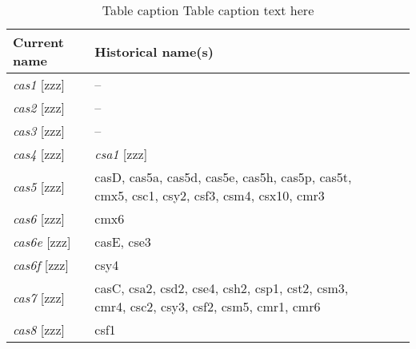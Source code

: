 \begin{table}
\caption{{Table caption} Table caption text here}
\centering
\begin{small}
\begin{tabular}{p{}M{0.1\textwidth}M{0.15\textwidth}M{0.1\textwidth}M{0.1\textwidth}M{0.125\textwidth}}

\toprule

\textbf{Current name}  & \textbf{Historical name(s)} \\
\midrule
\emph{cas1} [zzz] & -- \\
\emph{cas2} [zzz] & -- \\
\emph{cas3} [zzz] & -- \\
\emph{cas4} [zzz] & \emph{csa1} [zzz] \\
\emph{cas5} [zzz] & casD, cas5a, cas5d, cas5e, cas5h, cas5p, cas5t, cmx5, csc1, csy2, csf3, csm4, csx10, cmr3 \\
\emph{cas6} [zzz] & cmx6 \\
\emph{cas6e} [zzz] & casE, cse3 \\
\emph{cas6f} [zzz] & csy4 \\
\emph{cas7} [zzz] & casC, csa2, csd2, cse4, csh2, csp1, cst2, csm3, cmr4, csc2, csy3, csf2, csm5, cmr1, cmr6 \\
\emph{cas8} [zzz] & csf1 \\

\bottomrule
\end{tabular}
\end{small}
\label{tab:1}
\end{table}
